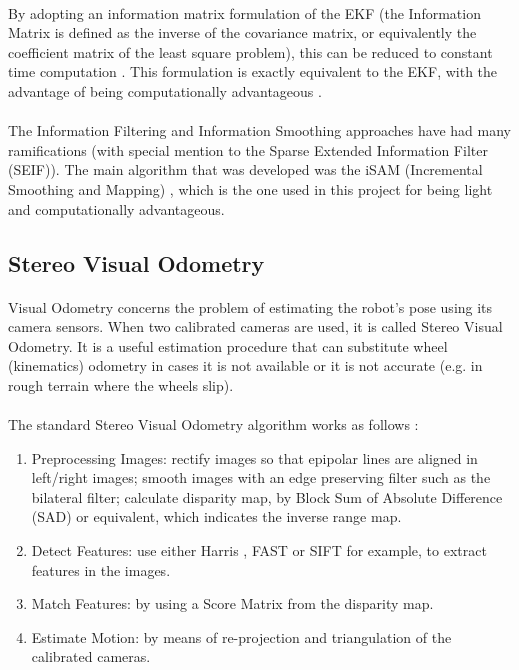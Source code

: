 \documentclass[12pt]{article}
\begin{document}
	\paragraph{}
	By adopting an information matrix formulation of the EKF (the Information Matrix is defined as the inverse of the covariance matrix, or equivalently the coefficient matrix of the least square problem), this can be reduced to constant time computation \cite{doi:10.1117/12.381658}. This formulation is exactly equivalent to the EKF, with the advantage of being computationally advantageous \cite{Dellaert-2006-9639}.
	
	\paragraph{}
	The Information Filtering and Information Smoothing approaches have had many ramifications (with special mention to the Sparse Extended Information Filter (SEIF)\cite{doi:10.1117/12.381658}). The main algorithm that was developed was the iSAM (Incremental Smoothing and Mapping) \cite{Kaess08tro}, which is the one used in this project for being light and computationally advantageous.	
	
	\subsection{Stereo Visual Odometry}
	\paragraph{}
	Visual Odometry concerns the problem of estimating the robot's pose using its camera sensors. When two calibrated cameras are used, it is called Stereo Visual Odometry. It is a useful estimation procedure that can substitute wheel (kinematics) odometry in cases it is not available or it is not accurate (e.g. in rough terrain where the wheels slip).
	
	\paragraph{}
	The standard Stereo Visual Odometry algorithm works as follows \cite{StereoVis1}:
	\begin{enumerate}[leftmargin=.8in]
	\item Preprocessing Images: rectify images so that epipolar lines are aligned in left/right images; smooth images with an edge preserving filter such as the bilateral filter; calculate disparity map, by Block Sum of Absolute Difference (SAD) or equivalent, which indicates the inverse range map.
	\item Detect Features: use either Harris \cite{Harris}, FAST \cite{FAST} or  SIFT \cite{SIFT} for example, to extract features in the images.
	\item Match Features: by using a Score Matrix from the disparity map.
	\item Estimate Motion: by means of re-projection and triangulation of the calibrated cameras.
	\end{enumerate}
	
\end{document}

